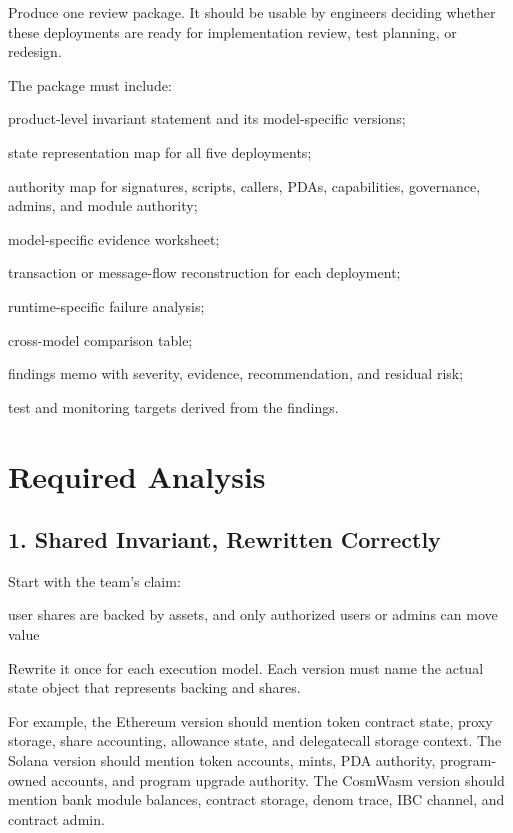 \begin{artifactbox}
Produce one review package. It should be usable by engineers deciding whether these deployments are ready for implementation review, test planning, or redesign.
\end{artifactbox}

The package must include:

\begin{artifactchecklist}
\item product-level invariant statement and its model-specific versions;
\item state representation map for all five deployments;
\item authority map for signatures, scripts, callers, PDAs, capabilities, governance, admins, and module authority;
\item model-specific evidence worksheet;
\item transaction or message-flow reconstruction for each deployment;
\item runtime-specific failure analysis;
\item cross-model comparison table;
\item findings memo with severity, evidence, recommendation, and residual risk;
\item test and monitoring targets derived from the findings.
\end{artifactchecklist}

\section*{Required Analysis}

\subsection*{1. Shared Invariant, Rewritten Correctly}

Start with the team's claim:

\begin{codeblock}
user shares are backed by assets,
and only authorized users or admins can move value
\end{codeblock}

Rewrite it once for each execution model. Each version must name the actual state object that represents backing and shares.

For example, the Ethereum version should mention token contract state, proxy storage, share accounting, allowance state, and delegatecall storage context. The Solana version should mention token accounts, mints, PDA authority, program-owned accounts, and program upgrade authority. The CosmWasm version should mention bank module balances, contract storage, denom trace, IBC channel, and contract admin.


